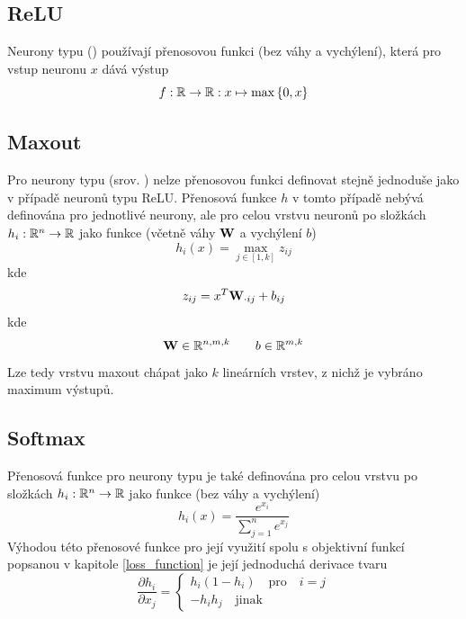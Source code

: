 \subsection{ReLU}
Neurony typu  () používají přenosovou funkci (bez váhy a vychýlení), která pro vstup neuronu \( x \) dává výstup
\[ f : \mathbb R \to \mathbb R : x \mapsto \max \left\{ 0, x \right\} \]

\subsection{Maxout}
Pro neurony typu  (srov. \cite{goodfellow_maxout_2013}) nelze přenosovou funkci definovat stejně jednoduše jako v případě neuronů typu ReLU. Přenosová funkce \( h \) v tomto případě nebývá definována pro jednotlivé neurony, ale pro celou vrstvu neuronů po složkách \( h_i : \mathbb R^n \to \mathbb R \) jako funkce (včetně váhy \( \mathbf W \) a vychýlení \( b \))
\[ h_i \left( x \right) = \max_{j \in \left[ 1, k \right]} z_{ij} \]
kde
\[ z_{ij} = x^T \mathbf W_{\cdot ij} + b_{ij} \]
kde
\[ \mathbf W \in \mathbb R^{n, m, k} \qquad b \in \mathbb R^{m, k} \]
Lze tedy vrstvu maxout chápat jako \( k \) lineárních vrstev, z nichž je vybráno maximum výstupů.

\subsection{Softmax}
Přenosová funkce pro neurony typu  je také definována pro celou vrstvu po složkách \( h_i : \mathbb R^n \to \mathbb R \) jako funkce (bez váhy a vychýlení)
\[ h_i \left( x \right) = \frac{e^{x_i}}{\sum_{j = 1}^n e^{x_j}} \]
Výhodou této přenosové funkce pro její využití spolu s objektivní funkcí popsanou v kapitole \ref{loss_function} je její jednoduchá derivace tvaru
\[ \frac{\partial h_i}{\partial x_j} = \begin{cases}
	h_i \left( 1 - h_i \right) \quad \text{pro} \quad i = j \\
	-h_i h_j \quad \text{jinak}
\end{cases} \]


